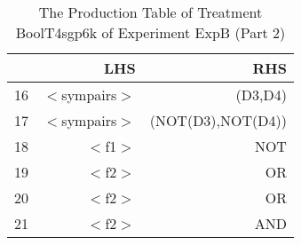 \begin{table}[ht]
\centering
\begin{tabular}{rrr}
  \hline
 & LHS & RHS \\ 
  \hline
16 & $<$sympairs$>$ & (D3,D4) \\ 
  17 & $<$sympairs$>$ & (NOT(D3),NOT(D4)) \\ 
  18 & $<$f1$>$ & NOT \\ 
  19 & $<$f2$>$ & OR \\ 
  20 & $<$f2$>$ & OR \\ 
  21 & $<$f2$>$ & AND \\ 
   \hline
\end{tabular}
\caption{The Production Table of Treatment BoolT4sgp6k of Experiment ExpB (Part 2)} 
\end{table}
